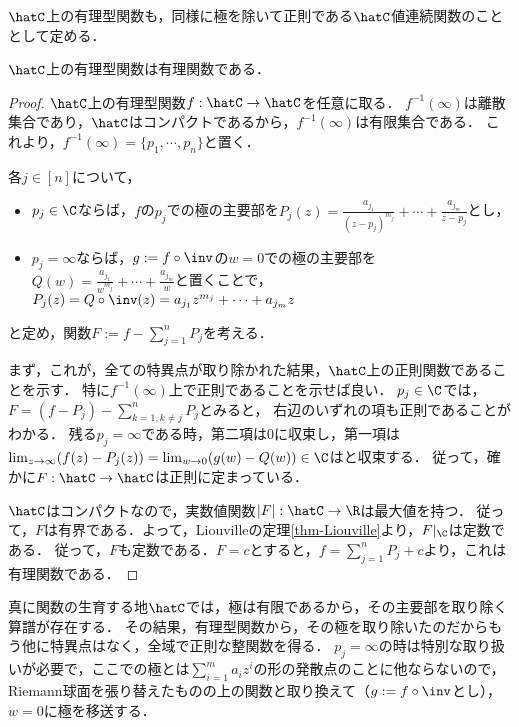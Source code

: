 \documentclass[uplatex, dvipdfmx]{jsreport}
\begin{document}
\begin{definition}
    $\hatC$上の有理型関数も，同様に極を除いて正則である$\hatC$値連続関数のこととして定める．
\end{definition}

\begin{theorem}\label{thm-meromorphic-function-is-rational}
    $\hatC$上の有理型関数は有理関数である．
\end{theorem}
\begin{proof}
    $\hatC$上の有理型関数$f:\hatC\to\hatC$を任意に取る．
    $f^{-1}(\infty)$は離散集合であり，$\hatC$はコンパクトであるから，$f^{-1}(\infty)$は有限集合である．
    これより，$f^{-1}(\infty)=\{p_1,\cdots,p_n\}$と置く．

    各$j\in[n]$について，
    \begin{itemize}
        \item $p_j\in\C$ならば，$f$の$p_j$での極の主要部を$P_j(z)=\frac{a_{j_1}}{(z-p_j)^{m_j}}+\cdots+\frac{a_{j_m}}{z-p_j}$とし，
        \item $p_j=\infty$ならば，$g:=f\circ\inv$の$w=0$での極の主要部を$Q(w)=\frac{a_{j_1}}{w^{m_j}}+\cdots+\frac{a_{j_m}}{w}$と置くことで，$P_j(z)=Q\circ\inv(z)=a_{j_1}z^{m_j}+\cdots+a_{j_m}z$
    \end{itemize}
    と定め，関数$F:=f-\sum^n_{j=1}P_j$を考える．
    
    まず，これが，全ての特異点が取り除かれた結果，$\hatC$上の正則関数であることを示す．
    特に$f^{-1}(\infty)$上で正則であることを示せば良い．
    $p_j\in\C$では，$F=(f-P_j)-\sum^n_{k=1,k\ne j}P_j$とみると，
    右辺のいずれの項も正則であることがわかる．
    残る$p_j=\infty$である時，第二項は$0$に収束し，第一項は$\lim_{z\to\infty}(f(z)-P_j(z))=\lim_{w\to 0}(g(w)-Q(w))\in\C$はと収束する．
    従って，確かに$F:\hatC\to\hatC$は正則に定まっている．

    $\hatC$はコンパクトなので，実数値関数$|F|:\hatC\to\R$は最大値を持つ．
    従って，$F$は有界である．よって，Liouvilleの定理\ref{thm-Liouville}より，$F|_\C$は定数である．
    従って，$F$も定数である．$F=c$とすると，$f=\sum^n_{j=1}P_j+c$より，これは有理関数である．
\end{proof}
\begin{remarks}
    真に関数の生育する地$\hatC$では，極は有限であるから，その主要部を取り除く算譜が存在する．
    その結果，有理型関数から，その極を取り除いたのだからもう他に特異点はなく，全域で正則な整関数を得る．
    $p_j=\infty$の時は特別な取り扱いが必要で，ここでの極とは$\sum^m_{i=1}a_iz^i$の形の発散点のことに他ならないので，
    Riemann球面を張り替えたものの上の関数と取り換えて（$g:=f\circ\inv$とし），
    $w=0$に極を移送する．
\end{remarks}
\end{document}

